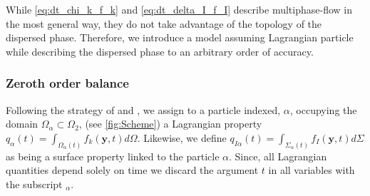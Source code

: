 
\label{sec:dispersed-two-fluid}
While \ref{eq:dt_chi_k_f_k} and \ref{eq:dt_delta_I_f_I} describe multiphase-flow in the most general way, they do not take advantage of the topology of the dispersed phase. 
Therefore, we introduce a model assuming Lagrangian particle while describing the dispersed phase to an arbitrary order of accuracy. 

\subsubsection*{Zeroth order balance }
Following the strategy of \citet{paisant2014modelisation,zaepffel2012multisize,zaepffel2011modelisation,lhuillier2010multiphase} and \citet[Chapter 4]{morel2015mathematical}, 
we assign to a particle indexed, $\alpha$, occupying the domain $\Omega_\alpha \subset \Omega_2$, (see \ref{fig:Scheme}) a Lagrangian property $q_\alpha(t)
= \int_{\Omega_\alpha(t)} f_k(\textbf{y},t) d\Omega$.
Likewise, we define $q_{I\alpha}(t) = \int_{\Sigma_\alpha(t)} f_I(\textbf{y},t) d\Sigma$ as being a surface property linked to the particle $\alpha$.
Since, all Lagrangian quantities depend solely on time we discard the argument $t$ in all variables with the subscript $_\alpha$.

